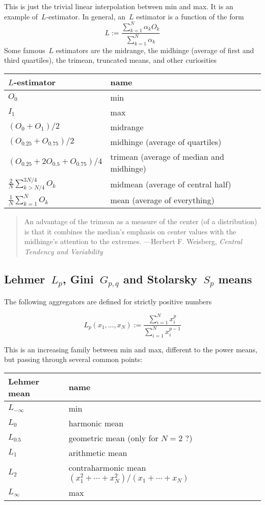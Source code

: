 \documentclass[a4paper]{article}
\begin{document}
This is just the trivial linear interpolation between min and max.
It is an example of~$L$-estimator.  In general, an~$L$ estimator is a
function of the form
\[
	L := \frac{\sum_{k=1}^N{\alpha_kO_k}}{\sum_{k=1}^N{\alpha_k}}
\]
Some famous~$L$ estimators are the midrange, the midhinge (average of
first and third quartiles), the trimean, truncated means, and other curiosities

\medskip

\begin{tabular}{l|l}
	$L$-estimator & name \\
	\hline
	$O_0$ & min \\
	$I_1$ & max \\
	$(O_0+O_1)/2$ & midrange \\
	$(O_{0.25}+O_{0.75})/2$ & midhinge (average of quartiles) \\
	$(O_{0.25}+2O_{0.5}+O_{0.75})/4$ & trimean (average of median
	and midhinge) \\
	$\frac{2}{N}\sum_{k>N/4}^{3N/4} O_k$ & midmean (average of
	central half) \\
	$\frac{1}{N}\sum_{k=1}^{N} O_k$ & mean (average of
	everything)
\end{tabular}

\medskip

\begin{quote}
An advantage of the trimean as a measure of the center (of a
distribution) is that it combines the median's emphasis on center
values with the midhinge's attention to the extremes.\hfill
	---Herbert F. Weisberg, \emph{Central Tendency and Variability}
\end{quote}

\subsection{Lehmer~$L_p$, Gini~$G_{p,q}$ and Stolarsky~$S_p$ means}

The following aggregators are defined for strictly positive numbers

\[
	L_p(x_1,\ldots,x_N):=\frac{
		\displaystyle\sum_{i=1}^N x_i^p
		}{
		\displaystyle\sum_{i=1}^N x_i^{p-1}
		}
\]

This is an increasing family between min and max, different to the
power means, but passing through several common points:

\medskip

\begin{tabular}{l|l}
	Lehmer mean & name \\
	\hline
	$L_{-\infty}$ & min \\
	$L_0$ & harmonic mean \\
	$L_{0.5}$ & geometric mean (only for $N=2$ ?)\\
	$L_1$ & arithmetic mean \\
	$L_2$ & contraharmonic mean
	$(x_1^2+\cdots+x_N^2)/(x_1+\cdots+x_N)$ \\
	$L_{\infty}$ & max \\
\end{tabular}
\end{document}
